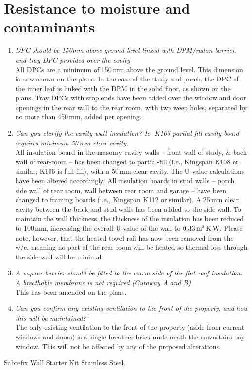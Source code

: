 \documentclass{extension}
\begin{document}
\section{Resistance to moisture and contaminants}
\begin{enumerate}
\item {\it DPC should be 150mm above ground level linked with DPM/radon barrier, and tray DPC provided over the cavity}\\
All DPCs are a minimum of 150\,mm above the ground level. This dimension is now shown on the plans. In the case of the study and porch, the DPC of the inner leaf is linked with the DPM in the solid floor, as shown on the plans. Tray DPCs with stop ends have been added over the window and door openings in the rear wall to the rear room, with two weep holes, separated by no more than 450\,mm, added per opening.
\item {\it Can you clarify the cavity wall insulation? Ie. K106 partial fill cavity board requires minimum 50\,mm clear cavity.}\\
All insulation board in the masonry cavity walls -- front wall of study, \& back wall of rear-room -- has been changed to partial-fill (i.e., Kingspan K108 or similar; K106 is full-fill), with a 50\,mm clear cavity. The U-value calculations have been altered accordingly. All insulation boards in stud walls -- porch, side wall of rear room, wall between rear room and garage -- have been changed to framing boards (i.e., Kingspan K112 or similar). A 25\,mm clear cavity between the brick and stud walls has been added to the side wall. To maintain the wall thickness, the thickness of the insulation has been reduced to 100\,mm, increasing the overall U-value of the wall to $0.33\,{\rm m^2\,K\,W}$. Please note, however, that the heated towel rail has now been removed from the w/c, meaning no part of the rear room will be heated so thermal loss through the side wall will be minimal.
\item {\it A vapour barrier should be fitted to the warm side of the flat roof insulation. A breathable membrane is not required (Cutaway A and B)}\\
This has been amended on the plans.
\item {\it Can you confirm any existing ventilation to the front of the property, and how this will be maintained?}\\
The only existing ventilation to the front of the property (aside from current windows and doors) is a single breather brick underneath the downstairs bay window. This will not be affected by any of the proposed alterations.
\end{enumerate}

\begin{thebibliography}{9}
 \href{https://www.screwfix.com/p/sabrefix-wall-starter-kit-stainless-steel/56037?kpid=56037&cm_mmc=Google-_-Datafeed-_-Building%20and%20Doors?kpid=KINASEKPID&cm_mmc=Google-_-TOKEN1-_-TOKEN2&gclid=EAIaIQobChMIvrnvoZmQgQMVjIFQBh3P7gMrEAQYAiABEgIWrvD_BwE&gclsrc=aw.ds}{Sabrefix Wall Starter Kit Stainless Steel}.



\end{thebibliography}
\end{document}

